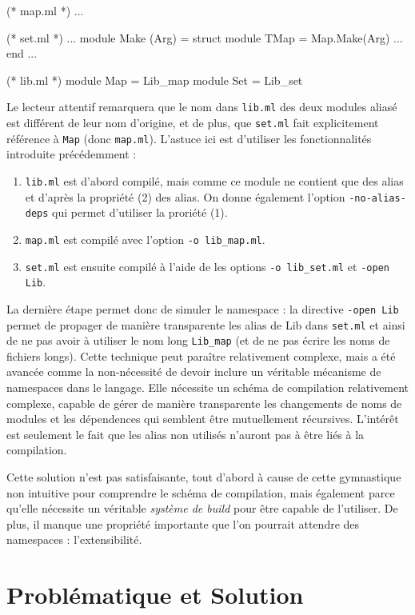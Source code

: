 \documentclass[11pt,a4paper]{report}
\begin{document}
\begin{OCaml}
(* map.ml *)
...

(* set.ml *)
...
module Make (Arg) =
struct
  module TMap = Map.Make(Arg)
  ...
end
...

(* lib.ml *)
module Map = Lib_map
module Set = Lib_set
\end{OCaml}

Le lecteur attentif remarquera que le nom dans \texttt{lib.ml} des deux modules
aliasé est différent de leur nom d'origine, et de plus, que \texttt{set.ml} fait
explicitement référence à \texttt{Map} (donc \texttt{map.ml}). L'astuce ici est
d'utiliser les fonctionnalités introduite précédemment :
\begin{enumerate}
\item \texttt{lib.ml} est d'abord compilé, mais comme ce module ne contient que
  des alias et d'après la propriété (2) des alias. On donne également l'option
  \texttt{-no-alias-deps} qui permet d'utiliser la proriété (1).
\item \texttt{map.ml} est compilé avec l'option \texttt{-o lib\_map.ml}.
\item \texttt{set.ml} est ensuite compilé à l'aide de les options \texttt{-o
  lib\_set.ml} et \texttt{-open Lib}.
\end{enumerate}

La dernière étape permet donc de simuler le namespace : la directive
\texttt{-open Lib} permet de propager de manière transparente les alias de Lib
dans \texttt{set.ml} et ainsi de ne pas avoir à utiliser le nom long
\texttt{Lib\_map} (et de ne pas écrire les noms de fichiers longs). Cette
technique peut paraître relativement complexe, mais a été avancée comme la
non-nécessité de devoir inclure un véritable mécanisme de namespaces dans le
langage. Elle nécessite un schéma de compilation relativement complexe, capable
de gérer de manière transparente les changements de noms de modules et les
dépendences qui semblent être mutuellement récursives. L'intérêt est seulement
le fait que les alias non utilisés n'auront pas à être liés à la compilation.

Cette solution n'est pas satisfaisante, tout d'abord à cause de cette
gymnastique non intuitive pour comprendre le schéma de compilation, mais
également parce qu'elle nécessite un véritable \emph{système de build} pour être
capable de l'utiliser. De plus, il manque une propriété importante que l'on
pourrait attendre des namespaces : l'extensibilité.

\chapter{Problématique et Solution}
\end{document}
